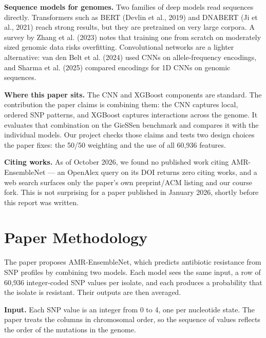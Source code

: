 \documentclass[11pt]{article}
\begin{document}
\textbf{Sequence models for genomes.} Two families of deep models read sequences directly. Transformers such as BERT (Devlin et al., 2019) and DNABERT (Ji et al., 2021) reach strong results, but they are pretrained on very large corpora. A survey by Zhang et al. (2023) notes that training one from scratch on moderately sized genomic data risks overfitting. Convolutional networks are a lighter alternative: van den Belt et al. (2024) used CNNs on allele-frequency encodings, and Sharma et al. (2025) compared encodings for 1D CNNs on genomic sequences.

\textbf{Where this paper sits.} The CNN and XGBoost components are standard. The contribution the paper claims is combining them: the CNN captures local, ordered SNP patterns, and XGBoost captures interactions across the genome. It evaluates that combination on the GieSSen benchmark and compares it with the individual models. Our project checks those claims and tests two design choices the paper fixes: the 50/50 weighting and the use of all 60,936 features.

\textbf{Citing works.} As of October 2026, we found no published work citing AMR-EnsembleNet --- an OpenAlex query on its DOI returns zero citing works, and a web search surfaces only the paper's own preprint/ACM listing and our course fork. This is not surprising for a paper published in January 2026, shortly before this report was written.

\section{Paper Methodology}

The paper proposes AMR-EnsembleNet, which predicts antibiotic resistance from SNP profiles by combining two models. Each model sees the same input, a row of 60,936 integer-coded SNP values per isolate, and each produces a probability that the isolate is resistant. Their outputs are then averaged.

\textbf{Input.} Each SNP value is an integer from 0 to 4, one per nucleotide state. The paper treats the columns in chromosomal order, so the sequence of values reflects the order of the mutations in the genome.
\end{document}
